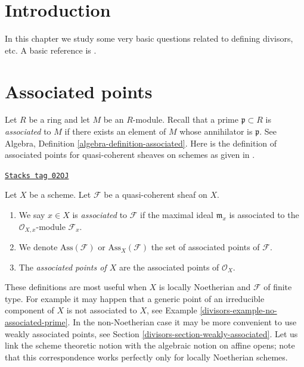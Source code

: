 \section{Introduction}
\label{divisors-section-introduction}
In this chapter we study some very basic questions related
to defining divisors, etc. A basic reference is \cite{EGA}.

\section{Associated points}
\label{divisors-section-associated}
Let $R$ be a ring and let $M$ be an $R$-module.
Recall that a prime $\mathfrak p \subset R$ is {\it associated} to $M$
if there exists an element of $M$ whose annihilator is $\mathfrak p$.
See Algebra, Definition \ref{algebra-definition-associated}.
Here is the definition of associated points
for quasi-coherent sheaves on schemes
as given in \cite[IV Definition 3.1.1]{EGA}.

\begin{definition}[Associated]
\label{divisors-definition-associated}
\href{https://stacks.math.columbia.edu/tag/02OJ}{\texttt{Stacks tag 02OJ}}

Let $X$ be a scheme.
Let $\mathcal{F}$ be a quasi-coherent sheaf on $X$.
\begin{enumerate}
\item We say $x \in X$ is {\it associated} to $\mathcal{F}$
if the maximal ideal
$\mathfrak m_x$ is associated to the $\mathcal{O}_{X, x}$-module
$\mathcal{F}_x$.
\item We denote $\text{Ass}(\mathcal{F})$ or $\text{Ass}_X(\mathcal{F})$
the set of associated points of $\mathcal{F}$.
\item The {\it associated points of $X$} are the associated
points of $\mathcal{O}_X$.
\end{enumerate}
\end{definition}

These definitions are most useful when $X$ is locally Noetherian
and $\mathcal{F}$ of finite type.
For example it may happen that a generic point of an irreducible
component of $X$ is not associated to $X$, see
Example \ref{divisors-example-no-associated-prime}.
In the non-Noetherian case it may be more convenient to use weakly
associated points, see
Section \ref{divisors-section-weakly-associated}.
Let us link the scheme theoretic notion with the algebraic notion
on affine opens; note that this correspondence works perfectly only
for locally Noetherian schemes.

